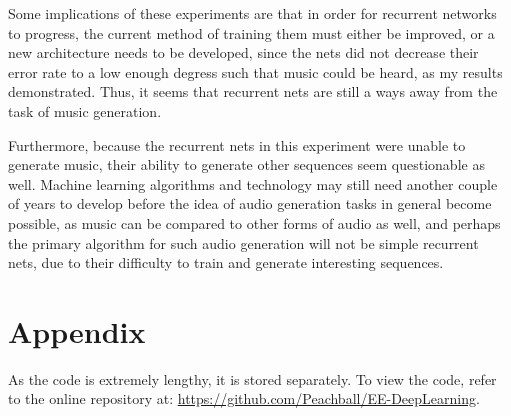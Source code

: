 \documentclass[12pt, titlepage]{article}
\begin{document}
Some implications of these experiments are that in order for recurrent networks
to progress, the current method of training them must either be improved, or
a new architecture needs to be developed, since the nets did not decrease their
error rate to a low enough degress such that music could be heard, as my results
demonstrated. Thus, it seems that recurrent nets are still a ways away from the
task of music generation.

Furthermore, because the recurrent nets in this experiment were unable to
generate music, their ability to generate other sequences seem questionable as
well. Machine learning algorithms and technology may still need another couple
of years to develop before the idea of audio generation tasks in general become
possible, as music can be compared to other forms of audio as well, and perhaps
the primary algorithm for such audio generation will not be simple recurrent
nets, due to their difficulty to train and generate interesting sequences.

\newpage
\section{Appendix}
As the code is extremely lengthy, it is stored separately. To view the code,
refer to the online repository at: \url{https://github.com/Peachball/EE-DeepLearning}.
\end{document}
